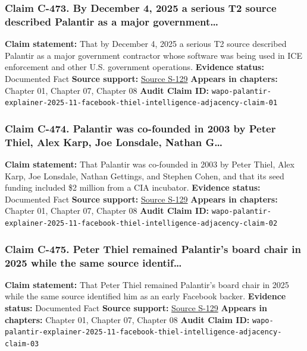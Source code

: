 \documentclass[
  american,
  11pt,
  letterpaper,
]{article}
\begin{document}
\subsubsection{Claim C-473. By December 4, 2025 a serious T2 source
described Palantir as a major
government\ldots{}}\label{claim-c-473-by-december-4-2025-a-serious-t2-source-described-palantir-as-a-major-government}

\textbf{Claim statement:} That by December 4, 2025 a serious T2 source
described Palantir as a major government contractor whose software was
being used in ICE enforcement and other U.S. government operations.
\textbf{Evidence status:} Documented Fact \textbf{Source support:}
\hyperref[source-s-129-what-to-know-about-palantir-the-tech-company-playing-a-key-role-for-ice]{Source
S-129} \textbf{Appears in chapters:} Chapter 01, Chapter 07, Chapter 08
\textbf{Audit Claim ID:}
\texttt{wapo-palantir-explainer-2025-11-facebook-thiel-intelligence-adjacency-claim-01}

\subsubsection{Claim C-474. Palantir was co-founded in 2003 by Peter
Thiel, Alex Karp, Joe Lonsdale, Nathan
G\ldots{}}\label{claim-c-474-palantir-was-co-founded-in-2003-by-peter-thiel-alex-karp-joe-lonsdale-nathan-g}

\textbf{Claim statement:} That Palantir was co-founded in 2003 by Peter
Thiel, Alex Karp, Joe Lonsdale, Nathan Gettings, and Stephen Cohen, and
that its seed funding included \$2 million from a CIA incubator.
\textbf{Evidence status:} Documented Fact \textbf{Source support:}
\hyperref[source-s-129-what-to-know-about-palantir-the-tech-company-playing-a-key-role-for-ice]{Source
S-129} \textbf{Appears in chapters:} Chapter 01, Chapter 07, Chapter 08
\textbf{Audit Claim ID:}
\texttt{wapo-palantir-explainer-2025-11-facebook-thiel-intelligence-adjacency-claim-02}

\subsubsection{Claim C-475. Peter Thiel remained Palantir's board chair
in 2025 while the same source
identif\ldots{}}\label{claim-c-475-peter-thiel-remained-palantir-s-board-chair-in-2025-while-the-same-source-identif}

\textbf{Claim statement:} That Peter Thiel remained Palantir's board
chair in 2025 while the same source identified him as an early Facebook
backer. \textbf{Evidence status:} Documented Fact \textbf{Source
support:}
\hyperref[source-s-129-what-to-know-about-palantir-the-tech-company-playing-a-key-role-for-ice]{Source
S-129} \textbf{Appears in chapters:} Chapter 01, Chapter 07, Chapter 08
\textbf{Audit Claim ID:}
\texttt{wapo-palantir-explainer-2025-11-facebook-thiel-intelligence-adjacency-claim-03}
\end{document}

